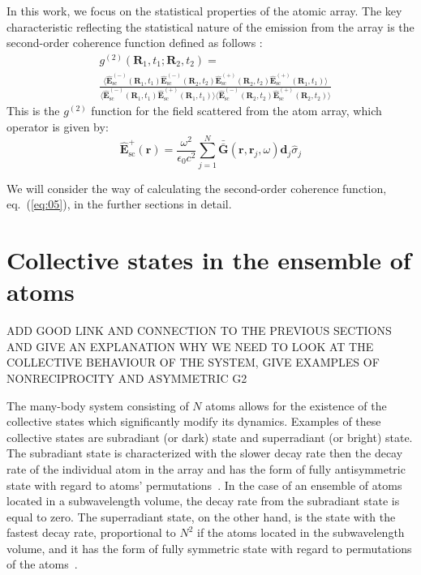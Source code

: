 \documentclass[aps,prl,twocolumn,superscriptaddress,showpacs,amsmath,amssymb]{revtex4-2}
\begin{document}
In this work, we focus on the statistical properties of the atomic array. 
The key characteristic reflecting the statistical nature of the emission from the array is the second-order coherence function defined as follows \cite{mandel1995optical}:
\begin{align}
    & g^{(2)}(\mathbf{R}_1, t_1; \mathbf{R}_2, t_2) = \nonumber \\ 
    & \frac{\langle \hat{\mathbf{E}}_\mathrm{sc}^{(-)} (\mathbf{R}_1, t_1) \hat{\mathbf{E}}_\mathrm{sc}^{(-)} (\mathbf{R}_2, t_2) \hat{\mathbf{E}}_\mathrm{sc}^{(+)} (\mathbf{R}_2, t_2) \hat{\mathbf{E}}_\mathrm{sc}^{(+)} (\mathbf{R}_1, t_1)\rangle}{\langle
    \hat{\mathbf{E}}_\mathrm{sc}^{(-)} (\mathbf{R}_1, t_1) \hat{\mathbf{E}}_\mathrm{sc}^{(+)} (\mathbf{R}_1, t_1) \rangle \langle \hat{\mathbf{E}}_\mathrm{sc}^{(-)} (\mathbf{R}_2, t_2) \hat{\mathbf{E}}_\mathrm{sc}^{(+)} (\mathbf{R}_2, t_2) \rangle} 
    \label{eq:05}
\end{align}
This is the $g^{(2)}$ function for the field scattered from the atom array, which operator is given by:
\begin{equation} 
    \hat{\mathbf{E}}_\mathrm{sc}^+(\mathbf{r}) = \frac{\omega^2}{\epsilon_0 c^2} \sum_{j=1}^N \bar{\bar{\mathbf{G}}}(\mathbf{r}, \mathbf{r}_j, \omega) \mathbf{d}_j \hat{\sigma}_j
    \label{eq:06}
\end{equation}

We will consider the way of calculating the second-order coherence function, eq.~(\ref{eq:05}), in the further sections in detail.

\section{Collective states in the ensemble of atoms}

\uppercase{Add good link and connection to the previous sections and give an explanation why we need to look at the collective behaviour of the system, give examples of nonreciprocity and asymmetric g2}

The many-body system consisting of $N$ atoms allows for the existence of the collective states which significantly modify its dynamics. 
Examples of these collective states are subradiant (or dark) state and superradiant (or bright) state.
The subradiant state is characterized with the slower decay rate then the decay rate of the individual atom in the array and has the form of fully antisymmetric state with regard to atoms' permutations~\cite{gross1982superradiance}.
In the case of an ensemble of atoms located in a subwavelength volume, the decay rate from the subradiant state is equal to zero.
The superradiant state, on the other hand, is the state with the fastest decay rate, proportional to $N^2$ if the atoms located in the subwavelength volume, and it has the form of fully symmetric state with regard to permutations of the atoms~\cite{gross1982superradiance}. 
\end{document}
